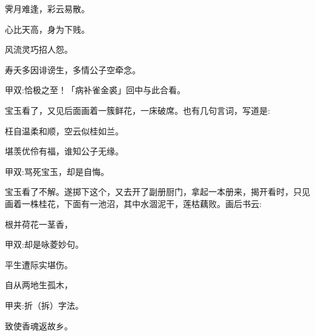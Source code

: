 \begin{poem}
    \begin{pl}霁月难逢，彩云易散。\end{pl}

    \begin{pl}心比天高，身为下贱。\end{pl}

    \begin{pl}风流灵巧招人怨。\end{pl}

    \begin{pl}寿夭多因诽谤生，多情公子空牵念。\end{pl}
    \begin{note}甲双:恰极之至！「病补雀金裘」回中与此合看。\end{note}

\end{poem}


\begin{parag}
    宝玉看了，又见后面画着一簇鲜花，一床破席。也有几句言词，写道是:
\end{parag}


\begin{poem}
    \begin{pl}枉自温柔和顺，空云似桂如兰。\end{pl}

    \begin{pl}堪羡优伶有福，谁知公子无缘。\end{pl}
    \begin{note}甲双:骂死宝玉，却是自悔。\end{note}

\end{poem}


\begin{parag}
    宝玉看了不解。遂掷下这个，又去开了副册厨门，拿起一本册来，揭开看时，只见画着一株桂花，下面有一池沼，其中水涸泥干，莲枯藕败。画后书云:
\end{parag}


\begin{poem}
    \begin{pl}根并荷花一茎香，\end{pl}
    \begin{note}甲双:却是咏菱妙句。\end{note}

    \begin{pl}平生遭际实堪伤。\end{pl}

    \begin{pl}自从两地生孤木，\end{pl}
    \begin{note}甲夹:折（拆）字法。\end{note}

    \begin{pl}致使香魂返故乡。\end{pl}
\end{poem}


